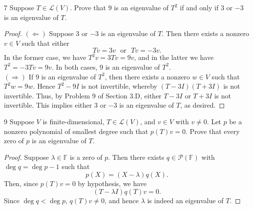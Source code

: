 \documentclass[11pt]{extarticle}
\newenvironment{problem}[1]{\begin{prob*}{#1}{}}{\end{prob*}}
\newcommand{\F}{\mathbb{F}}
\newcommand{\poly}{\mathcal{P}}
\newcommand{\Hom}{\mathcal{L}}
\begin{document}
\begin{problem}{7}
Suppose $T\in\Hom(V)$.  Prove that $9$ is an eigenvalue of $T^2$ if and only if $3$ or $-3$ is an eigenvalue of $T$.
\end{problem}
\begin{proof}
$(\Leftarrow)$ Suppose $3$ or $-3$ is an eigenvalue of $T$.  Then there exists a nonzero $v\in V$ such that either 
\begin{equation*}
Tv = 3v ~~~\text{or}~~~ Tv = -3v.
\end{equation*}
In the former case, we have $T^2v = 3Tv = 9v$, and in the latter we have $T^2 = -3Tv = 9v$.  In both cases, $9$ is an eigenvalue of $T^2$.\\
\indent $(\Rightarrow)$ If $9$ is an eigenvalue of $T^2$, then there exists a nonzero $w\in V$ such that $T^2w = 9w$.  Hence $T^2 - 9I$ is not invertible, whereby $(T - 3I)(T + 3I)$ is not invertible.  Thus, by Problem 9 of Section 3.D, either $T-3I$ or $T+3I$ is not invertible.  This implies either $3$ or $-3$ is an eigenvalue of $T$, as desired.
\end{proof}

\begin{problem}{9}
Suppose $V$ is finite-dimensional, $T\in\Hom(V)$, and $v\in V$ with $v\neq 0$.  Let $p$ be a nonzero polynomial of smallest degree such that $p(T)v = 0$.  Prove that every zero of $p$ is an eigenvalue of $T$.
\end{problem}
\begin{proof}
Suppose $\lambda\in\F$ is a zero of $p$.  Then there exists $q\in\poly(\F)$ with $\deg q = \deg p - 1$ such that 
\begin{equation*}
p(X) = (X - \lambda)q(X).
\end{equation*}
Then, since $p(T)v = 0$ by hypothesis, we have
\begin{equation*}
(T - \lambda I)q(T)v = 0.
\end{equation*}
Since $\deg q < \deg p$, $q(T)v\neq 0$, and hence $\lambda$ is indeed an eigenvalue of $T$.
\end{proof}
\end{document}
